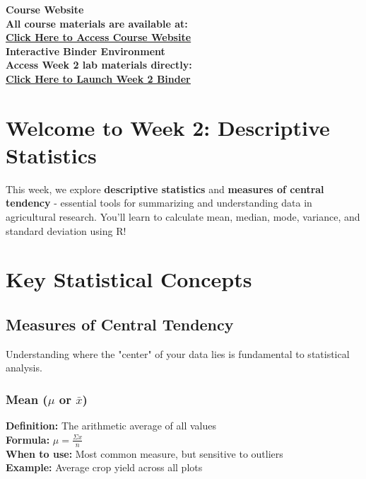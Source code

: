 \documentclass[11pt,a4paper]{article}
\begin{document}
\begin{tcolorbox}[colback=accentgreen!20, colframe=primarygreen, boxrule=2pt, arc=5pt, title={\textbf{\Large Essential Course Resources}}]
\centering
\textbf{\Large Course Website}\\[0.5cm]
\textcolor{primarygreen}{\textbf{All course materials are available at:}}\\[0.3cm]
\href{https://mohammadrezanarimaniucdavis.github.io/PLS120-Statistics-Lab-Materials/}{{\textbf{\Large \textcolor{primarygreen}{\underline{Click Here to Access Course Website}}}}}\\[0.8cm]

\textbf{\Large Interactive Binder Environment}\\[0.5cm]
\textcolor{primarygreen}{\textbf{Access Week 2 lab materials directly:}}\\[0.3cm]
\href{https://mybinder.org/v2/gh/MohammadrezaNarimaniUCDavis/PLS120-Statistics-Lab-Materials/binder-week2}{{\textbf{\Large \textcolor{primarygreen}{\underline{Click Here to Launch Week 2 Binder}}}}}
\end{tcolorbox}

\section{Welcome to Week 2: Descriptive Statistics}

This week, we explore \textbf{descriptive statistics} and \textbf{measures of central tendency} - essential tools for summarizing and understanding data in agricultural research. You'll learn to calculate mean, median, mode, variance, and standard deviation using R!

\section{Key Statistical Concepts}

\subsection{Measures of Central Tendency}

Understanding where the "center" of your data lies is fundamental to statistical analysis.

\subsubsection{Mean ($\mu$ or $\bar{x}$)}

\begin{formulabox}
\textbf{Definition:} The arithmetic average of all values\\[0.3cm]
\textbf{Formula:} $\mu = \frac{\Sigma x}{n}$\\[0.3cm]
\textbf{When to use:} Most common measure, but sensitive to outliers\\
\textbf{Example:} Average crop yield across all plots
\end{formulabox}
\end{document}
